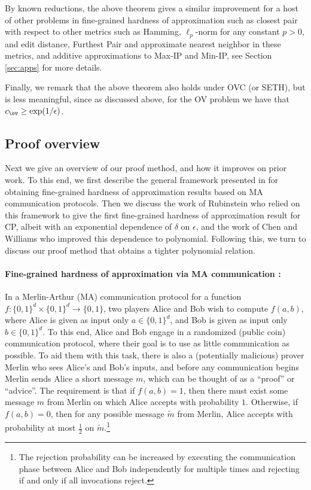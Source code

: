 \documentclass[11pt]{article}
\begin{document}
By known reductions, the above theorem gives a similar improvement for a host of other problems in fine-grained hardness of approximation such as closest pair with respect to other metrics such as Hamming,  $\ell_p$-norm for any constant $p>0$, and edit distance, Furthest Pair and approximate nearest neighbor in these metrics, and additive approximations to Max-IP and Min-IP, see Section \ref{sec:apps} for more details. 

Finally, we remark that the above theorem also holds under OVC (or SETH), but is less meaningful, since as discussed above, for the OV problem we have that $c_{\ov} \geq \exp(1/\epsilon)$. 

\subsection{Proof overview}

Next we give an overview of our proof method, and how it improves on prior work. To this end, we first describe the general framework presented in \cite{ARW17} for obtaining fine-grained hardness of approximation results based on MA communication protocols. Then we discuss the work of Rubinstein \cite{Rub18} who relied on this framework to give the first fine-grained hardness of approximation result for CP, albeit with an exponential dependence of $\delta$ on $\epsilon$, and the work of Chen and Williams \cite{CW19} who improved this dependence to polynomial. Following this, we turn to discuss our proof method that obtains a tighter polynomial relation.

\paragraph{Fine-grained hardness of approximation via MA communication \cite{ARW17}:}  In a Merlin-Arthur (MA) communication protocol for a function $f: \{0,1\}^d \times \{0,1\}^d \to \{0,1\}$, two players
Alice and Bob wish to compute
$f(a,b)$, where Alice is given as input only
$a \in\{0,1\}^d$, and Bob is given as input only $b \in \{0,1\}^d$.
To this end, Alice and Bob engage in a randomized (public coin) communication protocol, where their goal is to use as little communication as possible. 
To aid them with this task, there is also  a (potentially malicious)
prover Merlin who sees Alice's and Bob's inputs, and before any communication
begins Merlin sends Alice a short message $m$, which can be thought of as a ``proof'' or ``advice''. 
The requirement is that if $f(a,b)=1$, then there must exist
some message $m$ from Merlin on which Alice accepts with probability
$1$. Otherwise, if $f(a,b)=0$, then for any possible message $\tilde m$ from Merlin, Alice accepts with probability
at most $\frac 12$ on $\tilde m$.\footnote{The rejection probability can be increased by executing the communication phase between Alice and Bob independently for multiple times and rejecting if and only if all invocations reject.} 
\end{document}
